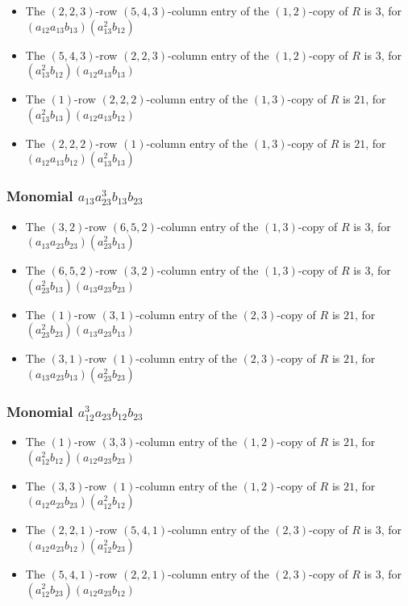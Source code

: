 \documentclass{article}
\begin{document}
\begin{itemize}
\item The $(2, 2, 3)$-row $(5, 4, 3)$-column entry of the $ \left(1, 2\right) $-copy of $R$ is $ 3 $, for $( a_{12} a_{13} b_{13} )( a_{13}^{2} b_{12} )$ 
\item The $(5, 4, 3)$-row $(2, 2, 3)$-column entry of the $ \left(1, 2\right) $-copy of $R$ is $ 3 $, for $( a_{13}^{2} b_{12} )( a_{12} a_{13} b_{13} )$ 
\item The $(1)$-row $(2, 2, 2)$-column entry of the $ \left(1, 3\right) $-copy of $R$ is $ 21 $, for $( a_{13}^{2} b_{13} )( a_{12} a_{13} b_{12} )$ 
\item The $(2, 2, 2)$-row $(1)$-column entry of the $ \left(1, 3\right) $-copy of $R$ is $ 21 $, for $( a_{12} a_{13} b_{12} )( a_{13}^{2} b_{13} )$ 
\end{itemize}
\subsubsection{Monomial $ a_{13} a_{23}^{3} b_{13} b_{23} $}

\begin{itemize}
\item The $(3, 2)$-row $(6, 5, 2)$-column entry of the $ \left(1, 3\right) $-copy of $R$ is $ 3 $, for $( a_{13} a_{23} b_{23} )( a_{23}^{2} b_{13} )$ 
\item The $(6, 5, 2)$-row $(3, 2)$-column entry of the $ \left(1, 3\right) $-copy of $R$ is $ 3 $, for $( a_{23}^{2} b_{13} )( a_{13} a_{23} b_{23} )$ 
\item The $(1)$-row $(3, 1)$-column entry of the $ \left(2, 3\right) $-copy of $R$ is $ 21 $, for $( a_{23}^{2} b_{23} )( a_{13} a_{23} b_{13} )$ 
\item The $(3, 1)$-row $(1)$-column entry of the $ \left(2, 3\right) $-copy of $R$ is $ 21 $, for $( a_{13} a_{23} b_{13} )( a_{23}^{2} b_{23} )$ 
\end{itemize}
\subsubsection{Monomial $ a_{12}^{3} a_{23} b_{12} b_{23} $}

\begin{itemize}
\item The $(1)$-row $(3, 3)$-column entry of the $ \left(1, 2\right) $-copy of $R$ is $ 21 $, for $( a_{12}^{2} b_{12} )( a_{12} a_{23} b_{23} )$ 
\item The $(3, 3)$-row $(1)$-column entry of the $ \left(1, 2\right) $-copy of $R$ is $ 21 $, for $( a_{12} a_{23} b_{23} )( a_{12}^{2} b_{12} )$ 
\item The $(2, 2, 1)$-row $(5, 4, 1)$-column entry of the $ \left(2, 3\right) $-copy of $R$ is $ 3 $, for $( a_{12} a_{23} b_{12} )( a_{12}^{2} b_{23} )$ 
\item The $(5, 4, 1)$-row $(2, 2, 1)$-column entry of the $ \left(2, 3\right) $-copy of $R$ is $ 3 $, for $( a_{12}^{2} b_{23} )( a_{12} a_{23} b_{12} )$ 
\end{itemize}
\end{document}
